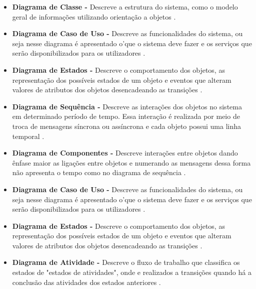     \begin{itemize}
       \item \textbf{Diagrama de Classe -}
       Descreve a estrutura do sistema, como o modelo geral de informações utilizando orientação a objetos \cite{nunesfundamental}.
        
        \item \textbf{Diagrama de Caso de Uso -}
        Descreve as funcionalidades do sistema, ou seja nesse diagrama é apresentado o'que o sistema deve fazer e os serviços que serão disponibilizados para os utilizadores \cite{nunesfundamental}.
        
        \item \textbf{Diagrama de Estados -}
        Descreve o comportamento dos objetos, as representação dos possíveis estados de um objeto e eventos que alteram valores de atributos dos objetos desencadeando as transições \cite{uml}.
        
        \item \textbf{Diagrama de Sequência -}
        Descreve as interações dos objetos no sistema em determinado período de tempo. Essa interação é realizada por meio de troca de mensagens síncrona ou assíncrona e cada objeto possui uma linha temporal \cite{uml}.
        
        \item \textbf{Diagrama de Componentes -}
        Descreve interações entre objetos dando ênfase maior as ligações entre objetos e numerando as mensagens dessa forma não apresenta o tempo como no diagrama de sequência \cite{uml}.
        
        \item \textbf{Diagrama de Caso de Uso -}
        Descreve as funcionalidades do sistema, ou seja nesse diagrama é apresentado o'que o sistema deve fazer e os serviços que serão disponibilizados para os utilizadores \cite{nunesfundamental}.
        
        \item \textbf{Diagrama de Estados -}
        Descreve o comportamento dos objetos, as representação dos possíveis estados de um objeto e eventos que alteram valores de atributos dos objetos desencadeando as transições \cite{uml}.
        
        \item \textbf{Diagrama de Atividade -}
        Descreve o fluxo de trabalho que classifica os estados de "estados de atividades", onde e realizados a transições quando há a conclusão das atividades dos estados anteriores \cite{uml}.
        

\end{itemize}

